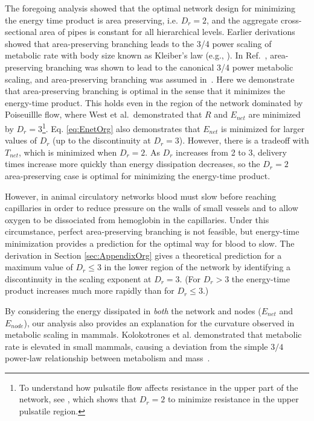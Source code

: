 \documentclass[12pt]{article}
\begin{document}
The foregoing analysis showed that the optimal network design for
minimizing the energy time product is area preserving, i.e. $D_r = 2$,
and the aggregate cross-sectional area of pipes is constant for all
hierarchical levels. Earlier derivations showed that area-preserving
branching leads to the 3/4 power scaling of metabolic rate with body
size known as Kleiber's law (e.g., \cite{west97, banavar10}).  In
Ref.~\cite{west97}, area-preserving branching was shown to lead to the canonical
3/4 power metabolic scaling, and area-preserving branching was
assumed in~\cite{banavar10}. Here we demonstrate that
area-preserving branching is optimal in the sense that it minimizes the energy-time product.
This holds even in the region of the network dominated by Poiseuillle flow, where
West et al.\ demonstrated that $R$ and $E_{net}$ are minimized by $D_r
=3$\footnote{To understand how pulsatile flow affects resistance in
  the upper part of the network, see \cite{west97}, which shows that
  $D_r = 2$ to minimize resistance in the upper pulsatile region.}. Eq. \ref{eq:EnetOrg} also demonstrates that $E_{net}$ is minimized for larger values of $D_r$ (up to the discontinuity at $D_r =3$). However, there is a tradeoff with $T_{net}$,
which is minimized when $D_r =2$. As $D_r$ increases from 2 to 3,
delivery times increase more quickly than energy dissipation decreases,
so the $D_r =2$ area-preserving case is optimal for minimizing the
energy-time product.

However, in animal circulatory networks blood must slow before reaching capillaries in order to
reduce pressure on the walls of small vessels and to allow oxygen to be
dissociated from hemoglobin in the capillaries.   Under this circumstance,
perfect area-preserving branching is not feasible, but energy-time 
minimization provides a prediction for the optimal way for blood to slow.
The derivation in Section \ref{sec:AppendixOrg} gives a
theoretical prediction for a maximum value of $D_r \leq 3$ in the lower region
of the network by identifying a discontinuity in the scaling exponent at $D_r =
3$. (For $D_r > 3$ the energy-time product increases much more rapidly than for
$D_r \leq 3$.)

By considering the energy dissipated in \emph{both} the network and 
nodes ($E_{net}$ and $E_{node}$), our analysis also provides an explanation for the curvature observed in
metabolic scaling in mammals. Kolokotrones et al.
demonstrated that metabolic rate is elevated in small mammals, causing a
deviation from the simple $3/4$ power-law relationship between metabolism and
mass~\cite{kolokotrones2010curvature}. 
\end{document}
